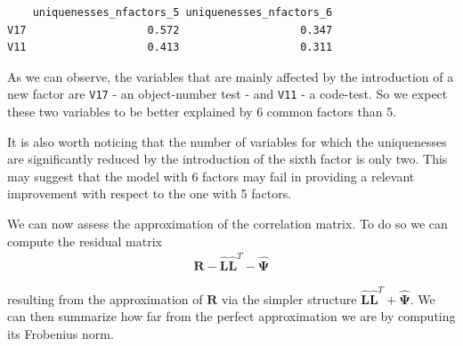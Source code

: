 \documentclass[
  letterpaper,
  DIV=11,
  numbers=noendperiod]{scrartcl}
\begin{document}
\begin{verbatim}
    uniquenesses_nfactors_5 uniquenesses_nfactors_6
V17                   0.572                   0.347
V11                   0.413                   0.311
\end{verbatim}

As we can observe, the variables that are mainly affected by the
introduction of a new factor are \texttt{V17} - an object-number test -
and \texttt{V11} - a code-test. So we expect these two variables to be
better explained by 6 common factors than 5.

It is also worth noticing that the number of variables for which the
uniquenesses are significantly reduced by the introduction of the sixth
factor is only two. This may suggest that the model with 6 factors may
fail in providing a relevant improvement with respect to the one with 5
factors.

We can now assess the approximation of the correlation matrix. To do so
we can compute the residual matrix \[
\begin{aligned}
  \mathbf{R} - \hat{\mathbf{L}}\hat{\mathbf{L}}^T - \hat{\mathbf{\Psi}}
\end{aligned}
\]

resulting from the approximation of \(\mathbf{R}\) via the simpler
structure \(\hat{\mathbf{L}}\hat{\mathbf{L}}^T + \hat{\mathbf{\Psi}}\).
We can then summarize how far from the perfect approximation we are by
computing its Frobenius norm.
\end{document}
